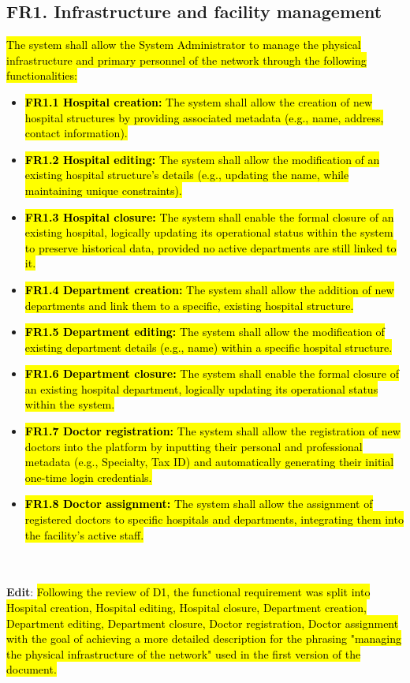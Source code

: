 \documentclass[12pt, a4paper]{article}
\begin{document}
\subsection{FR1. Infrastructure and facility management} \label{FR1}
\hl{The system shall allow the System Administrator to manage the physical infrastructure and primary personnel of the network through the following functionalities:}

\begin{itemize}
    \item \hl{\textbf{FR1.1 Hospital creation:} The system shall allow the creation of new hospital structures by providing associated metadata (e.g., name, address, contact information).}
    \item \hl{\textbf{FR1.2 Hospital editing:} The system shall allow the modification of an existing hospital structure's details (e.g., updating the name, while maintaining unique constraints).}
    \item \hl{\textbf{FR1.3 Hospital closure:} The system shall enable the formal closure of an existing hospital, logically updating its operational status within the system to preserve historical data, provided no active departments are still linked to it.}
    \item \hl{\textbf{FR1.4 Department creation:} The system shall allow the addition of new departments and link them to a specific, existing hospital structure.}
    \item \hl{\textbf{FR1.5 Department editing:} The system shall allow the modification of existing department details (e.g., name) within a specific hospital structure.}
    \item \hl{\textbf{FR1.6 Department closure:} The system shall enable the formal closure of an existing hospital department, logically updating its operational status within the system.}
    \item \hl{\textbf{FR1.7 Doctor registration:} The system shall allow the registration of new doctors into the platform by inputting their personal and professional metadata (e.g., Specialty, Tax ID) and automatically generating their initial one-time login credentials.}
    \item \hl{\textbf{FR1.8 Doctor assignment:} The system shall allow the assignment of registered doctors to specific hospitals and departments, integrating them into the facility's active staff.}
\end{itemize}
\\
\\ \textbf{Edit}:
\hl{Following the review of D1, the functional requirement was split into Hospital creation, Hospital editing, Hospital closure, Department creation, Department editing, Department closure, Doctor registration, Doctor assignment with the goal of achieving a more detailed description for the phrasing "managing the physical infrastructure of the network" used in the first version of the document.}
\end{document}
